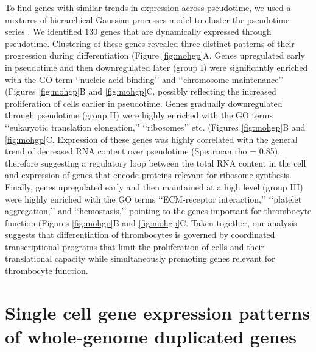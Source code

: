 To find genes with similar trends in expression across pseudotime, we used a mixtures of hierarchical Gaussian processes model to cluster the pseudotime series \cite{Hensman2015-op}. We identified 130 genes that are dynamically expressed through pseudotime. Clustering of these genes revealed three distinct patterns of their progression during differentiation (Figure \ref{fig:mohgp}A. Genes upregulated early in pseudotime and then downregulated later (group I) were significantly enriched with the GO term ‘‘nucleic acid binding’’ and ‘‘chromosome maintenance’’ (Figures \ref{fig:mohgp}B and \ref{fig:mohgp}C, possibly reflecting the increased proliferation of cells earlier in pseudotime. Genes gradually downregulated through pseudotime (group II) were highly enriched with the GO terms ‘‘eukaryotic translation elongation,’’ ‘‘ribosomes’’ etc. (Figures \ref{fig:mohgp}B and \ref{fig:mohgp}C. Expression of these genes was highly correlated with the general trend of decreased RNA content over pseudotime (Spearman rho = 0.85), therefore suggesting a regulatory loop between the total RNA content in the cell and expression of genes that encode proteins relevant for ribosome synthesis. Finally, genes upregulated early and then maintained at a high level (group III) were highly enriched with the GO terms ‘‘ECM-receptor interaction,’’ ‘‘platelet aggregation,’’ and ‘‘hemostasis,’’ pointing to the genes important for thrombocyte function (Figures \ref{fig:mohgp}B and \ref{fig:mohgp}C. Taken together, our analysis suggests that differentiation of thrombocytes is governed by coordinated transcriptional programs that limit the proliferation of cells and their translational capacity while simultaneously promoting genes relevant for thrombocyte function.

\section{Single cell gene expression patterns of whole-genome duplicated genes}

